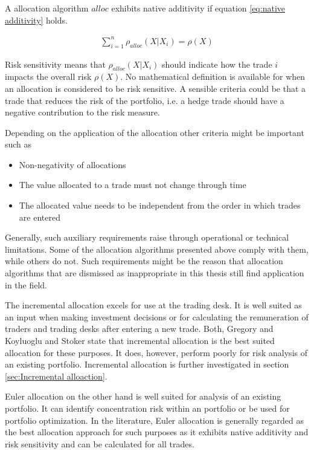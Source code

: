 \documentclass[../Thesis_AHoecherl.tex]{subfiles}
\begin{document}
A allocation algorithm $alloc$ exhibits native additivity if equation \ref{eq:native additivity} holds.

\begin{align}
    \sum_{i=1}^n{\rho_{alloc}\left(X|X_i\right)} = \rho\left(X\right)
    \label{eq:native additivity}
\end{align}

Risk sensitivity means that $\rho_{alloc}\left(X|X_i\right)$ should indicate how the trade $i$ impacts the overall risk $\rho\left(X\right)$. 
No mathematical definition is available for when an allocation is considered to be risk sensitive. A sensible criteria could be that a trade that reduces the risk of the portfolio, i.e. a hedge trade should have a negative contribution to the risk measure.

Depending on the application of the allocation other criteria might be important such as
\begin{itemize}
    \item Non-negativity of allocations
    \item The value allocated to a trade must not change through time
    \item The allocated value needs to be independent from the order in which trades are entered 
\end{itemize}
Generally, such auxiliary requirements raise through operational or technical limitations. Some of the allocation algorithms presented above comply with them, while others do not. 
Such requirements might be the reason that allocation algorithms that are dismissed as inappropriate in this thesis still find application in the field.

The incremental allocation excels for use at the trading desk. It is well suited as an input when making investment decisions or for calculating the remuneration of traders and trading desks after entering a new trade.
Both, Gregory \cite{gregory2015xva} and Koyluoglu and Stoker \cite{koyluoglu2002risk} state that incremental allocation is the best suited allocation for these purposes. It does, however, perform poorly for risk analysis of an existing portfolio. Incremental allocation is further investigated in section \ref{sec:Incremental alloaction}.

Euler allocation on the other hand is well suited for analysis of an existing portfolio. It can identify concentration risk within an portfolio or be used for portfolio optimization. 
In the literature, Euler allocation is generally regarded as the best allocation approach for such purposes as it exhibits native additivity and risk sensitivity and can be calculated for all trades.
\end{document}
